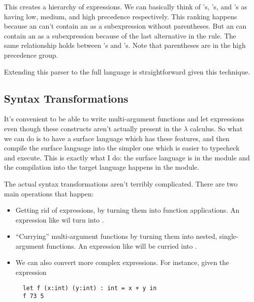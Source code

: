 \documentclass[pageno]{jpaper}
\begin{document}
{{{\begin{figure}
\begin{lstlisting}
\end{lstlisting}
\end{figure}
\FloatBarrier

This creates a hierarchy of expressions.  We can basically think of 's, 's, and 's as having low, medium, and high precedence respectively.
This ranking happens because an  can't contain an  as a subexpression without
parentheses. But an  can contain an  as a subexpression because of the last
alternative in the  rule.  The same relationship holds between 's and
's.  Note that parentheses are in the high precedence group.

Extending this parser to the full language is straightforward given this technique.


\subsection{Syntax Transformations}

It's convenient to be able to write multi-argument functions and let expressions
even though these constructs aren't actually present in the $\lambda$ calculus.
So what we can do is to have a surface language which has these features, and then compile
the surface language into the simpler one which is easier to typecheck and execute.
This is exactly what I do: the surface language is in the module
 and the compilation into the target language happens in the  module.

The actual syntax transformations aren't terribly complicated.
There are two main operations that happen:
\begin{itemize}
\item Getting rid of  expressions, by turning them into function applications.
An expression like  wil turn into .
\item ``Currying'' multi-argument functions by turning them into nested, single-argument functions.
An expression like  will be curried into
.
\item We can also convert more complex  expressions.
For instance, given the expression 

\begin{lstlisting}
  let f (x:int) (y:int) : int = x + y in
  f 73 5 
\end{lstlisting}
 

\end{itemize}}}}
\end{document}

